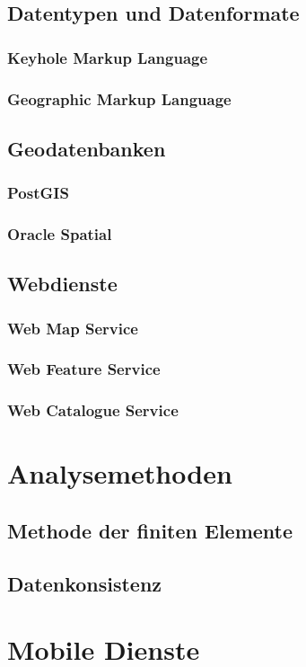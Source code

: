 \subsection{Datentypen und Datenformate}
\subsubsection{Keyhole Markup Language}
\subsubsection{Geographic Markup Language}
\subsection{Geodatenbanken}
\subsubsection{PostGIS}
\subsubsection{Oracle Spatial}
\subsection{Webdienste}
\subsubsection{Web Map Service}
\subsubsection{Web Feature Service}
\subsubsection{Web Catalogue Service}
\section{Analysemethoden}
\subsection{Methode der finiten Elemente}
\subsection{Datenkonsistenz}
\section{Mobile Dienste}


